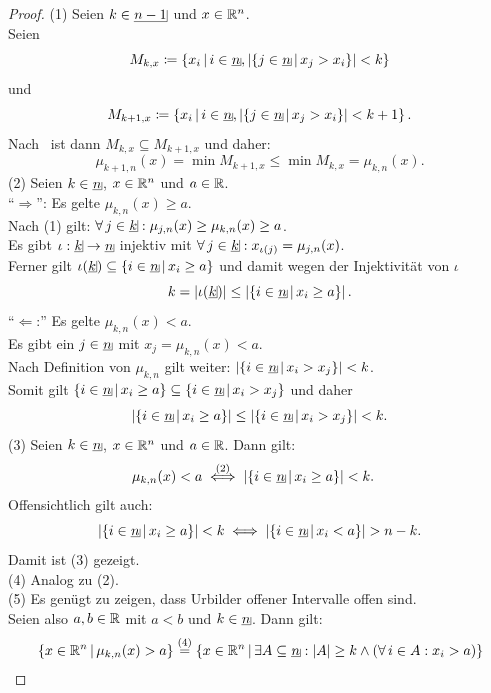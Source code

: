 \begin{proof}
(1) Seien $k \in \haken {n-1}$ und $x \in \mathbb{R}^n$.\\
Seien
\[M_{k, x}\coloneqq \menge{x_i}{i\in\haken n,\abs{\menge{j\in\haken n}{x_j>x_i}}<k}\]
und
\[M_{k+1,x}\coloneqq
\menge{x_i}{i\in\haken n,\abs{\menge{j\in\haken n}{x_j>x_i}}<k+1}.\]
Nach~ ist dann
$M_{k,x} \subseteq M_{k+1,x}$ und daher:
\[\mu_{k+1,n}(x) = \min M_{k+1,x} \le \min M_{k,x} = \mu_{k,n}(x).\]
(2) Seien $k \in \haken n$, $x \in \mathbb{R}^n$ und $a \in \mathbb{R}$.\\
\enquote{$\Rightarrow$}: Es gelte $\mu_{k,n}(x) \ge a$.\\
Nach (1) gilt: $\forall\,j\in\haken k: \mu_{j, n}(x) \ge \mu_{k, n}(x)\ge a$.\\
Es gibt $\iota: \haken k \rightarrow \haken n$ injektiv mit
$\forall\, j \in \haken k: x_{\iota(j)}= \mu_{j,n}(x)$.\\
Ferner gilt $\iota(\haken k) \subseteq \menge{i \in \haken n}{x_i \ge a}$ und
damit wegen der Injektivität von $\iota$
\[k = \abs{\iota(\haken k)} \le \abs{\menge{i \in \haken n}{x_i \ge a} }.\]
\enquote{$\Leftarrow$:} Es gelte $\mu_{k,n}(x) < a$.\\
Es gibt ein $j \in \haken n$ mit $x_j = \mu_{k,n}(x) < a$.\\
Nach Definition von $\mu_{k,n}$ gilt weiter: 
$\abs{\menge{i \in \haken n}{x_i> x_j}}<k$.\\
Somit gilt 
$\menge{i \in \haken n}{x_i\ge a} \subseteq \menge{i \in \haken n}{x_i > x_j}$
und daher
\[\abs{\menge{i\in\haken n}{x_i\ge a}}
\le\abs{\menge{i\in\haken n}{x_i>x_j}}<k.\]
(3) Seien $k \in \haken n$, $x \in \mathbb{R}^n$ und $a \in \mathbb{R}$. Dann gilt:
\begin{align*}
\mu_{k, n}(x) < a & \overset{(2)}\iff \abs{\menge{i \in \haken n}{x_i \ge a}}<k
\text.
\end{align*}
Offensichtlich gilt auch:
\[\abs{\menge{i \in \haken n}{x_i \ge a}}<k \iff
  \abs{\menge{i \in \haken n}{x_i < a}} > n-k\text.\]
Damit ist (3) gezeigt.\\
(4) Analog zu (2).\\
(5) Es genügt zu zeigen, dass Urbilder offener Intervalle offen sind.\\
Seien also $a, b \in \mathbb{R}$ mit $a < b$ und $k \in \haken n$. Dann gilt:
\begin{align*}
&\menge{x \in \R^n}{\mu_{k, n}(x)> a}
\overset{(4)}= \menge{x \in \R^n}{\exists A \subseteq \haken n: \abs A
\ge k \wedge (\forall\, i \in A: x_i > a)}\\

\end{align*}
\end{proof}
